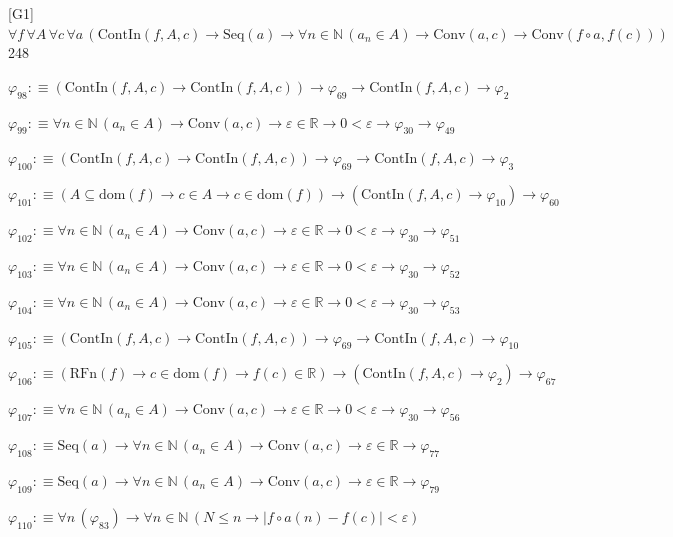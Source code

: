 \begin{fullproof}{[G1]}{$\forall f\,\forall A\,\forall c\,\forall a\,(\mathrm{ContIn}(f,A,c) \to \mathrm{Seq}(a) \to \forall n \in \mathbb{N}\,(a_{n} \in A) \to \mathrm{Conv}(a,c) \to \mathrm{Conv}(f \circ a,f(c)))$}{248}
\begin{abbrevlist}
\item $\varphi_{98} :\equiv (\mathrm{ContIn}(f,A,c) \to \mathrm{ContIn}(f,A,c)) \to \varphi_{69} \to \mathrm{ContIn}(f,A,c) \to \varphi_{2}$
\item $\varphi_{99} :\equiv \forall n \in \mathbb{N}\,(a_{n} \in A) \to \mathrm{Conv}(a,c) \to \varepsilon \in \mathbb{R} \to 0 < \varepsilon \to \varphi_{30} \to \varphi_{49}$
\item $\varphi_{100} :\equiv (\mathrm{ContIn}(f,A,c) \to \mathrm{ContIn}(f,A,c)) \to \varphi_{69} \to \mathrm{ContIn}(f,A,c) \to \varphi_{3}$
\item $\varphi_{101} :\equiv (A \subseteq \mathrm{dom}(f) \to c \in A \to c \in \mathrm{dom}(f)) \to (\mathrm{ContIn}(f,A,c) \to \varphi_{10}) \to \varphi_{60}$
\item $\varphi_{102} :\equiv \forall n \in \mathbb{N}\,(a_{n} \in A) \to \mathrm{Conv}(a,c) \to \varepsilon \in \mathbb{R} \to 0 < \varepsilon \to \varphi_{30} \to \varphi_{51}$
\item $\varphi_{103} :\equiv \forall n \in \mathbb{N}\,(a_{n} \in A) \to \mathrm{Conv}(a,c) \to \varepsilon \in \mathbb{R} \to 0 < \varepsilon \to \varphi_{30} \to \varphi_{52}$
\item $\varphi_{104} :\equiv \forall n \in \mathbb{N}\,(a_{n} \in A) \to \mathrm{Conv}(a,c) \to \varepsilon \in \mathbb{R} \to 0 < \varepsilon \to \varphi_{30} \to \varphi_{53}$
\item $\varphi_{105} :\equiv (\mathrm{ContIn}(f,A,c) \to \mathrm{ContIn}(f,A,c)) \to \varphi_{69} \to \mathrm{ContIn}(f,A,c) \to \varphi_{10}$
\item $\varphi_{106} :\equiv (\mathrm{RFn}(f) \to c \in \mathrm{dom}(f) \to f(c) \in \mathbb{R}) \to (\mathrm{ContIn}(f,A,c) \to \varphi_{2}) \to \varphi_{67}$
\item $\varphi_{107} :\equiv \forall n \in \mathbb{N}\,(a_{n} \in A) \to \mathrm{Conv}(a,c) \to \varepsilon \in \mathbb{R} \to 0 < \varepsilon \to \varphi_{30} \to \varphi_{56}$
\item $\varphi_{108} :\equiv \mathrm{Seq}(a) \to \forall n \in \mathbb{N}\,(a_{n} \in A) \to \mathrm{Conv}(a,c) \to \varepsilon \in \mathbb{R} \to \varphi_{77}$
\item $\varphi_{109} :\equiv \mathrm{Seq}(a) \to \forall n \in \mathbb{N}\,(a_{n} \in A) \to \mathrm{Conv}(a,c) \to \varepsilon \in \mathbb{R} \to \varphi_{79}$
\item $\varphi_{110} :\equiv \forall n\,(\varphi_{83}) \to \forall n \in \mathbb{N}\,(N \leq n \to \lvert f \circ a(n) - f(c) \rvert < \varepsilon)$

\end{abbrevlist}
\end{fullproof}
